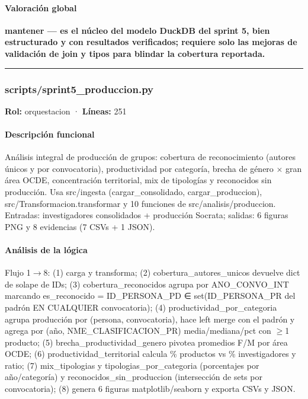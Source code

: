 \begin{tcolorbox}[riesgo]
\begin{itemize}
\end{itemize}
\end{tcolorbox}

\paragraph{Valoración global}
\textbf{mantener --- es el núcleo del modelo DuckDB del sprint 5, bien estructurado y con resultados verificados; requiere solo las mejoras de validación de join y tipos para blindar la cobertura reportada.}

\medskip
\hrule

\subsubsection{scripts/sprint5\_produccion.py}
\textbf{Rol:} orquestacion · \textbf{Líneas:} 251

\paragraph{Descripción funcional}
Análisis integral de producción de grupos: cobertura de reconocimiento (autores únicos y por convocatoria), productividad por categoría, brecha de género $\times$ gran área OCDE, concentración territorial, mix de tipologías y reconocidos sin producción. Usa src/ingesta (cargar\_consolidado, cargar\_produccion), src/Transformacion.transformar y 10 funciones de src/analisis/produccion. Entradas: investigadores consolidados + producción Socrata; salidas: 6 figuras PNG y 8 evidencias (7 CSVs + 1 JSON).

\paragraph{Análisis de la lógica}
Flujo 1$\rightarrow$8: (1) carga y transforma; (2) cobertura\_autores\_unicos devuelve dict de solape de IDs; (3) cobertura\_reconocidos agrupa por ANO\_CONVO\_INT marcando es\_reconocido = ID\_PERSONA\_PD ∈ set(ID\_PERSONA\_PR del padrón EN CUALQUIER convocatoria); (4) productividad\_por\_categoria agrupa producción por (persona, convocatoria), hace left merge con el padrón y agrega por (año, NME\_CLASIFICACION\_PR) media/mediana/pct con $\geq$1 producto; (5) brecha\_productividad\_genero pivotea promedios F/M por área OCDE; (6) productividad\_territorial calcula \% productos vs \% investigadores y ratio; (7) mix\_tipologias y tipologias\_por\_categoria (porcentajes por año/categoría) y reconocidos\_sin\_produccion (intersección de sets por convocatoria); (8) genera 6 figuras matplotlib/seaborn y exporta CSVs y JSON.


